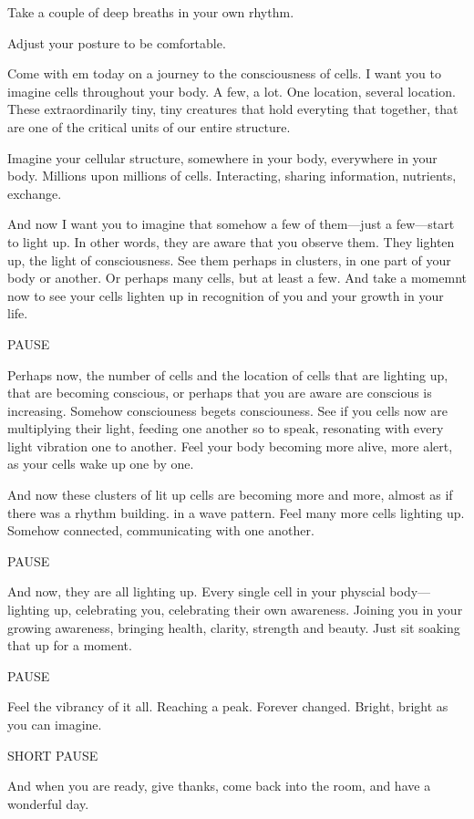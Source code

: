 \documentclass[12pt]{book}
\begin{document}
{\em


Take a couple of deep breaths in your own rhythm.

Adjust your posture to be comfortable.

Come with em today on a journey to the consciousness of cells.
I want you to imagine
cells throughout your body. A few, a lot. One location, several location.
These extraordinarily tiny, tiny creatures that hold everyting that together, that
are one of the critical units of our entire structure.

Imagine your cellular structure, somewhere in your body, everywhere in your body.
Millions upon millions of cells. Interacting, sharing information, nutrients,
exchange.

And now I want you to imagine that somehow a few of them---just a few---start to light up.
In other words, they are aware that you observe them.
They lighten up, the light of consciousness.
See them perhaps in clusters, in one part of your body or another.
Or perhaps many cells, but at least a few. And take a momemnt now
to see your cells lighten up in recognition of you and your growth in
your life.

PAUSE

Perhaps now, the number of cells and the location of cells that are lighting
up, that are becoming conscious, or perhaps that you are aware are conscious
is increasing. Somehow consciouness begets consciouness. See if you cells
now are multiplying their light, feeding one another so to speak, resonating
with every light vibration one to another. Feel your body becoming more
alive, more alert, as your cells wake up one by one.

And now these clusters of lit up cells are becoming more and more, almost
as if there was a rhythm building.
in a wave pattern. Feel many more cells lighting up. Somehow connected,
communicating with one another.

PAUSE

And now, they are all lighting up. Every single cell in your physcial
body---lighting up, celebrating you, celebrating their own awareness.
Joining you in your growing awareness, bringing health, clarity,
strength and beauty. Just sit soaking that up for a moment.

PAUSE

Feel the vibrancy of it all. Reaching a peak. Forever changed.
Bright, bright as you can imagine.

SHORT PAUSE

And when you are ready, give thanks, come back into the room,
and have a wonderful day.

}
\end{document}
